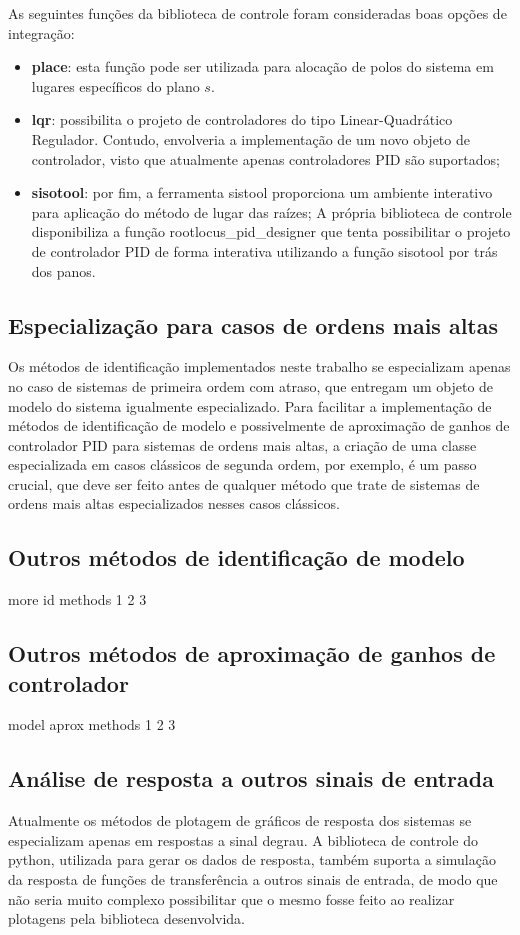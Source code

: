 As seguintes funções da biblioteca de controle foram consideradas boas opções de integração:
\begin{itemize}
    \item \textbf{place}: esta função pode ser utilizada para alocação de polos do sistema em lugares específicos do plano $s$.
    \item \textbf{lqr}: possibilita o projeto de controladores do tipo Linear-Quadrático Regulador.
    Contudo, envolveria a implementação de um novo objeto de controlador, visto que atualmente apenas controladores PID
    são suportados;
    \item \textbf{sisotool}: por fim, a ferramenta sistool proporciona um ambiente interativo para aplicação do método
    de lugar das raízes;
    A própria biblioteca de controle disponibiliza a função rootlocus\_pid\_designer que tenta possibilitar o projeto
    de controlador PID de forma interativa utilizando a função sisotool por trás dos panos.
\end{itemize}

\subsection{Especialização para casos de ordens mais altas}
Os métodos de identificação implementados neste trabalho se especializam apenas no caso de sistemas de primeira ordem
com atraso, que entregam um objeto de modelo do sistema igualmente especializado.
Para facilitar a implementação de métodos de identificação de modelo e possivelmente de aproximação de ganhos de
controlador PID para sistemas de ordens mais altas, a criação de uma classe especializada em casos clássicos de
segunda ordem, por exemplo, é um passo crucial, que deve ser feito antes de qualquer método que trate de sistemas
de ordens mais altas especializados nesses casos clássicos.

\subsection{Outros métodos de identificação de modelo}
more id methods
1
2
3

\subsection{Outros métodos de aproximação de ganhos de controlador}
model aprox methods
1
2
3

\subsection{Análise de resposta a outros sinais de entrada}
Atualmente os métodos de plotagem de gráficos de resposta dos sistemas se especializam apenas em respostas a sinal
degrau.
A biblioteca de controle do python, utilizada para gerar os dados de resposta, também suporta a simulação da resposta
de funções de transferência a outros sinais de entrada, de modo que não seria muito complexo possibilitar que o mesmo
fosse feito ao realizar plotagens pela biblioteca desenvolvida.

